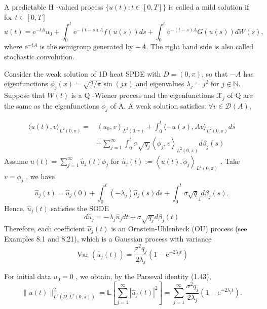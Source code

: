 \begin{definition}\label{mild solution}
A predictable  H -valued process  $\{u(t): t \in[0, T]\}$  is called a mild solution if for  $t \in[0, T] $
$$u(t)=\mathrm{e}^{-t A} u_{0}+\int_{0}^{t} \mathrm{e}^{-(t-s) A} f(u(s)) d s+\int_{0}^{t} \mathrm{e}^{-(t-s) A} G(u(s)) d W(s),$$
where  $\mathrm{e}^{-t A}$  is the semigroup generated by  $-A$. The right hand side is also called stochastic convolution.
\end{definition}

\begin{example}
    Consider the weak solution of 1D heat SPDE with  $D=(0, \pi)$, so that  $-A$  has eigenfunctions  $\phi_{j}(x)=\sqrt{2 / \pi} \sin (j x)$ 
    and eigenvalues  $\lambda_{j}=j^{2}$  for  $j \in \mathbb{N}$. Suppose that  $W(t)$  is a  Q -Wiener process 
    and the eigenfunctions  $\mathcal{X}_{j}$ of Q are the same as the eigenfunctions  $\phi_{j}$  of  A. A weak solution satisfies: $\forall v \in \mathcal{D}(A)$, 

\begin{equation}
    \begin{aligned}
    \langle u(t), v\rangle_{L^{2}(0, \pi)}= & \left\langle u_{0}, v\right\rangle_{L^{2}(0, \pi)}+\int_{0}^{t}\langle-u(s), A v\rangle_{L^{2}(0, \pi)} d s \\
    & +\sum_{j=1}^{\infty} \int_{0}^{t} \sigma \sqrt{q_{j}}\left\langle\phi_{j}, v\right\rangle_{L^{2}(0, \pi)} d \beta_{j}(s)
    \end{aligned}
\end{equation}
Assume $u(t)=\sum_{j=1}^{\infty} \hat{u}_{j}(t) \phi_{j}$  for  $\hat{u}_{j}(t):=\left\langle u(t), \phi_{j}\right\rangle_{L^{2}(0, \pi)}$ . Take  $v=\phi_{j}$ , we have 
\begin{equation}
    \hat{u}_{j}(t)=\hat{u}_{j}(0)+\int_{0}^{t}\left(-\lambda_{j}\right) \hat{u}_{j}(s) d s+\int_{0}^{t} \sigma \sqrt{q}_{j} d \beta_{j}(s) .
\end{equation}
Hence,  $\hat{u}_{j}(t)$  satisfies the SODE
\begin{equation}
d \hat{u}_{j}=-\lambda_{j} \hat{u}_{j} d t+\sigma \sqrt{q_{j}} d \beta_{j}(t)
\end{equation}
Therefore, each coefficient  $\hat{u}_{j}(t)$  is an Ornstein-Uhlenbeck (OU) process (see Examples 8.1 and 8.21), which is a Gaussian process with variance
\begin{equation}
\operatorname{Var}\left(\hat{u}_{j}(t)\right)=\frac{\sigma^{2} q_{j}}{2 \lambda_{j}}\left(1-\mathrm{e}^{-2 \lambda_{j} t}\right)
\end{equation}

For initial data  $u_{0}=0$ , we obtain, by the Parseval identity (1.43),
\begin{equation}
\|u(t)\|_{L^{2}\left(\Omega, L^{2}(0, \pi)\right)}^{2}=\mathbb{E}\left[\sum_{j=1}^{\infty}\left|\hat{u}_{j}(t)\right|^{2}\right]=\sum_{j=1}^{\infty} \frac{\sigma^{2} q_{j}}{2 \lambda_{j}}\left(1-\mathrm{e}^{-2 \lambda_{j} t}\right) .
\end{equation}
\end{example}

